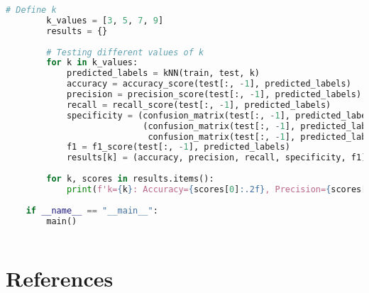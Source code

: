 \documentclass[11pt, a4paper]{article}
\begin{document}
\begin{lstlisting}[language=Python]
        # Define k
        k_values = [3, 5, 7, 9]
        results = {}
        
        # Testing different values of k
        for k in k_values:
            predicted_labels = kNN(train, test, k)
            accuracy = accuracy_score(test[:, -1], predicted_labels)
            precision = precision_score(test[:, -1], predicted_labels)
            recall = recall_score(test[:, -1], predicted_labels)
            specificity = (confusion_matrix(test[:, -1], predicted_labels)[0, 0] / 
                           (confusion_matrix(test[:, -1], predicted_labels)[0, 0] + 
                            confusion_matrix(test[:, -1], predicted_labels)[0, 1]))
            f1 = f1_score(test[:, -1], predicted_labels)
            results[k] = (accuracy, precision, recall, specificity, f1)
        
        for k, scores in results.items():
            print(f'k={k}: Accuracy={scores[0]:.2f}, Precision={scores[1]:.2f}, Recall={scores[2]:.2f}, Specificity={scores[3]:.2f}, F1={scores[4]:.2f}')
    
    if __name__ == "__main__":
        main()
    
\end{lstlisting}


\section*{References}
\end{document}

